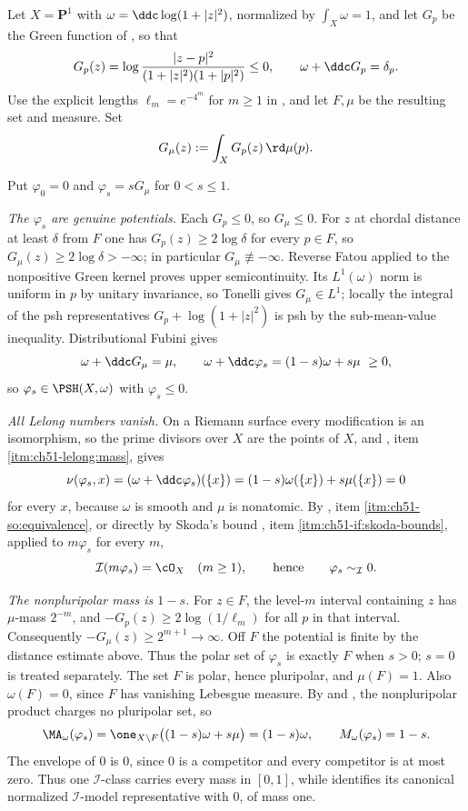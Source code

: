 \begin{example}
\label{ex:ch51-cantor}
Let $X=\mathbf P^1$ with $\omega=\ddc\log(1+|z|^2)$, normalized by
$\int_X\omega=1$, and let $G_p$ be the Green function of
, so that
\[
 G_p(z)=\log\frac{|z-p|^2}{(1+|z|^2)(1+|p|^2)}\leq0,
 \qquad
 \omega+\ddc G_p=\delta_p .
\]
Use the explicit lengths $\ell_m=e^{-4^m}$ for $m\geq1$ in
, and let $F,\mu$ be the resulting set and
measure.  Set
\[
 G_\mu(z):=\int_XG_p(z)\,\rd\mu(p).
\]

Put $\varphi_0=0$ and $\varphi_s=sG_\mu$ for $0<s\leq1$.

\emph{The $\varphi_s$ are genuine potentials.}  Each $G_p\leq0$, so
$G_\mu\leq0$.  For $z$ at chordal distance at least $\delta$ from
$F$ one has $G_p(z)\geq2\log\delta$ for every $p\in F$, so
$G_\mu(z)\geq2\log\delta>-\infty$; in particular
$G_\mu\not\equiv-\infty$.  Reverse Fatou applied to the nonpositive
Green kernel proves upper semicontinuity.  Its $L^1(\omega)$ norm is
uniform in $p$ by unitary invariance, so Tonelli gives $G_\mu\in L^1$;
locally the integral of the psh representatives $G_p+\log(1+|z|^2)$
is psh by the sub-mean-value inequality.  Distributional Fubini gives
\[
 \omega+\ddc G_\mu=\mu ,
 \qquad
 \omega+\ddc\varphi_s=(1-s)\omega+s\mu\ \geq0,
\]
so $\varphi_s\in\PSH(X,\omega)$ with $\varphi_s\leq0$.

\emph{All Lelong numbers vanish.}  On a Riemann surface every
modification is an isomorphism, so the prime divisors over $X$ are the
points of $X$, and
, item \cref{itm:ch51-lelong:mass}, gives
\[
 \nu(\varphi_s,x)=(\omega+\ddc\varphi_s)(\{x\})
 =(1-s)\omega(\{x\})+s\mu(\{x\})=0
\]
for every $x$, because $\omega$ is smooth and $\mu$ is nonatomic.
By , item
\cref{itm:ch51-so:equivalence}, or directly by Skoda's bound
, item \cref{itm:ch51-if:skoda-bounds}, applied
to $m\varphi_s$ for every $m$,
\[
 \mathcal I(m\varphi_s)=\cO_X\quad(m\geq1),
 \qquad\text{hence}\qquad
 \varphi_s\sim_{\mathcal I}0 .
\]

\emph{The nonpluripolar mass is $1-s$.}  For $z\in F$, the
level-$m$ interval containing $z$ has $\mu$-mass $2^{-m}$, and
$-G_p(z)\geq2\log(1/\ell_m)$ for all $p$ in that interval.
Consequently $-G_\mu(z)\geq2^{m+1}\to\infty$.  Off $F$ the potential
is finite by the distance estimate above.  Thus the polar set of
$\varphi_s$ is exactly $F$ when $s>0$; $s=0$ is treated separately.
The set $F$ is polar,
hence pluripolar, and $\mu(F)=1$.  Also $\omega(F)=0$, since $F$
has vanishing Lebesgue measure.  By
 and
, the nonpluripolar product charges no
pluripolar set, so
\[
 \MA_\omega(\varphi_s)
 =\one_{X\setminus F}\bigl((1-s)\omega+s\mu\bigr)
 =(1-s)\omega,
 \qquad
 M_\omega(\varphi_s)=1-s .
\]
The envelope of $0$ is $0$, since $0$ is a competitor and every
competitor is at most zero.  Thus one $\mathcal I$-class carries every
mass in $[0,1]$, while
 identifies its canonical
normalized $\mathcal I$-model representative with $0$, of mass one.


\end{example}

